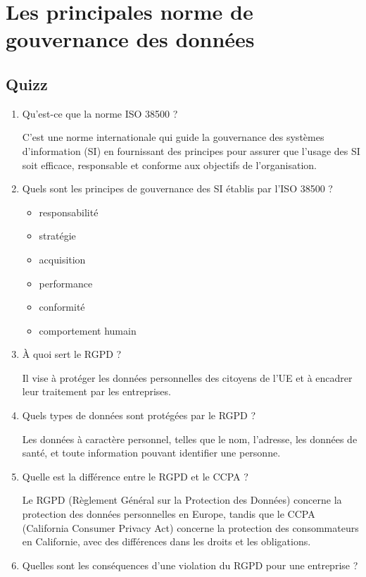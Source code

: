 \chapter{Les principales norme de gouvernance des données}

\section*{Quizz}

\begin{enumerate}
    \item Qu’est-ce que la norme ISO 38500 ?

        C'est une norme internationale qui guide la gouvernance des systèmes d'information (SI) en fournissant des principes pour assurer que l'usage des SI soit efficace, responsable et conforme aux objectifs de l'organisation.
    \item Quels sont les principes de gouvernance des SI établis par l'ISO 38500 ?

        \begin{itemize}
            \item responsabilité
            \item stratégie
            \item acquisition
            \item performance
            \item conformité
            \item comportement humain
        \end{itemize}
    \item À quoi sert le RGPD ?

        Il vise à protéger les données personnelles des citoyens de l'UE et à encadrer leur traitement par les entreprises.
    \item Quels types de données sont protégées par le RGPD ?

        Les données à caractère personnel, telles que le nom, l'adresse, les données de santé, et toute information pouvant identifier une personne.
    \item Quelle est la différence entre le RGPD et le CCPA ?

        Le RGPD (Règlement Général sur la Protection des Données) concerne la protection des données personnelles en Europe, tandis que le CCPA (California Consumer Privacy Act) concerne la protection des consommateurs en Californie, avec des différences dans les droits et les obligations.
    \item Quelles sont les conséquences d’une violation du RGPD pour une entreprise ?


\end{enumerate}
